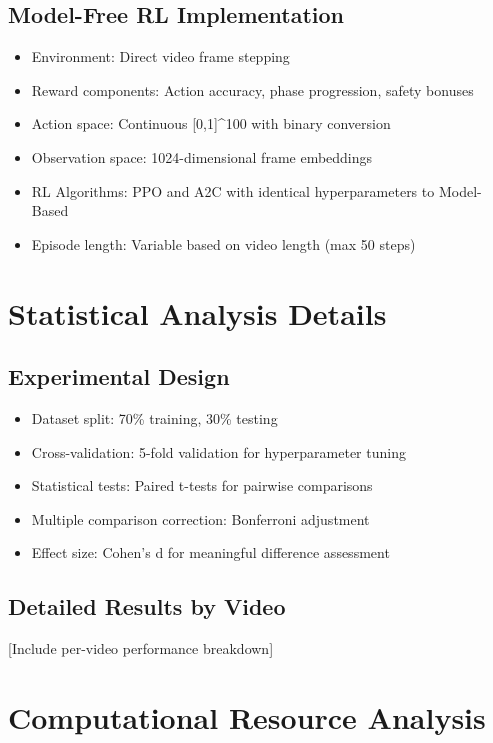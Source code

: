 \documentclass{article}
\begin{document}
\subsection{Model-Free RL Implementation}
\begin{itemize}
\item Environment: Direct video frame stepping
\item Reward components: Action accuracy, phase progression, safety bonuses
\item Action space: Continuous [0,1]^100 with binary conversion
\item Observation space: 1024-dimensional frame embeddings
\item RL Algorithms: PPO and A2C with identical hyperparameters to Model-Based
\item Episode length: Variable based on video length (max 50 steps)
\end{itemize}

\section{Statistical Analysis Details}

\subsection{Experimental Design}
\begin{itemize}
\item Dataset split: 70\% training, 30\% testing
\item Cross-validation: 5-fold validation for hyperparameter tuning
\item Statistical tests: Paired t-tests for pairwise comparisons
\item Multiple comparison correction: Bonferroni adjustment
\item Effect size: Cohen's d for meaningful difference assessment
\end{itemize}

\subsection{Detailed Results by Video}
[Include per-video performance breakdown]

\section{Computational Resource Analysis}
\end{document}
